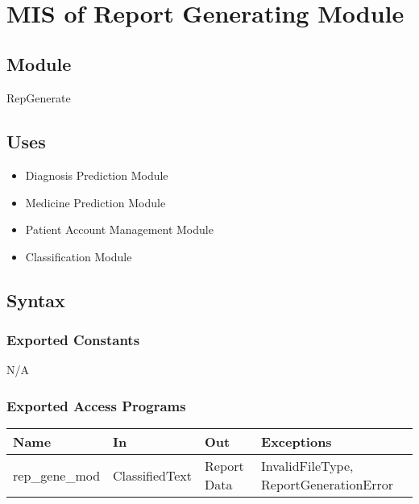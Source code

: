 \documentclass[12pt, titlepage]{article}
\begin{document}
\newpage
~\newpage
  






  
\section{MIS of Report Generating Module} \label{rep_gene_mod} 

\subsection{Module}
RepGenerate

\subsection{Uses}

\begin{itemize}
  \item Diagnosis Prediction Module
  \item Medicine Prediction Module
  \item Patient Account Management Module
  \item Classification Module
\end{itemize}

\subsection{Syntax}

\subsubsection{Exported Constants}

N/A

\subsubsection{Exported Access Programs}

\begin{center}
\begin{tabular}{p{2cm} p{4cm} p{4cm} p{2cm}}
\hline
\textbf{Name} & \textbf{In} & \textbf{Out} & \textbf{Exceptions} \\
\hline
rep_gene_mod & ClassifiedText & Report Data & InvalidFileType, ReportGenerationError & \\
\hline
\end{tabular}
\end{center}
\end{document}
